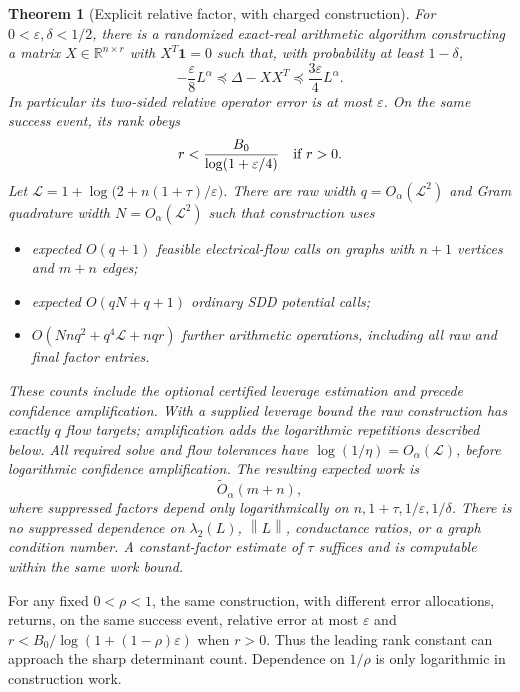 \documentclass[11pt]{article}
\newtheorem{theorem}{Theorem}[section]
\newcommand{\R}{\mathbb R}
\newcommand{\norm}[1]{\left\lVert#1\right\rVert}
\begin{document}
\begin{theorem}[Explicit relative factor, with charged construction]
\label{thm:main}
For $0<\varepsilon,\delta<1/2$, there is a randomized exact-real
arithmetic algorithm constructing a matrix $X\in\R^{n\times r}$ with
$X^T\mathbf1=0$ such that, with probability at least $1-\delta$,
\begin{equation}\label{eq:answer}
 -\frac\varepsilon8 L^\alpha
 \preceq \Delta-XX^T
 \preceq\frac{3\varepsilon}4 L^\alpha.
\end{equation}
In particular its two-sided relative operator error is at most
$\varepsilon$. On the same success event, its rank obeys
\begin{equation}\label{eq:rank}
 r<\frac{B_0}{\log(1+\varepsilon/4)}
 \quad\hbox{if }r>0.
\end{equation}
Let $\mathcal L=1+\log\bigl(2+n(1+\tau)/\varepsilon\bigr)$.
There are raw width $q=O_\alpha(\mathcal L^2)$ and Gram quadrature
width $N=O_\alpha(\mathcal L^2)$ such that construction uses
\begin{itemize}
\item expected $O(q+1)$ feasible electrical-flow calls on graphs with
$n+1$ vertices and $m+n$ edges;
\item expected $O(qN+q+1)$ ordinary SDD potential calls;
\item $O(Nnq^2+q^4\mathcal L+nqr)$ further arithmetic operations, including
all raw and final factor entries.
\end{itemize}
These counts include the optional certified leverage estimation and
precede confidence amplification. With a supplied leverage bound the
raw construction has exactly $q$ flow targets; amplification adds the
logarithmic repetitions described below.
All required solve and flow tolerances have
$\log(1/\eta)=O_\alpha(\mathcal L)$, before logarithmic confidence
amplification. The resulting expected work is
\[
 \widetilde O_\alpha(m+n),
\]
where suppressed factors depend only logarithmically on
$n,1+\tau,1/\varepsilon,1/\delta$. There is no suppressed dependence
on $\lambda_2(L)$, $\norm L$, conductance ratios, or a graph condition
number. A constant-factor estimate of $\tau$ suffices and is computable
within the same work bound.
\end{theorem}

For any fixed $0<\rho<1$, the same construction, with different error
allocations, returns, on the same success event, relative error at most
$\varepsilon$ and
$r<B_0/\log(1+(1-\rho)\varepsilon)$ when $r>0$. Thus the leading
rank constant can approach the sharp determinant count. Dependence on
$1/\rho$ is only logarithmic in construction work.
\end{document}
